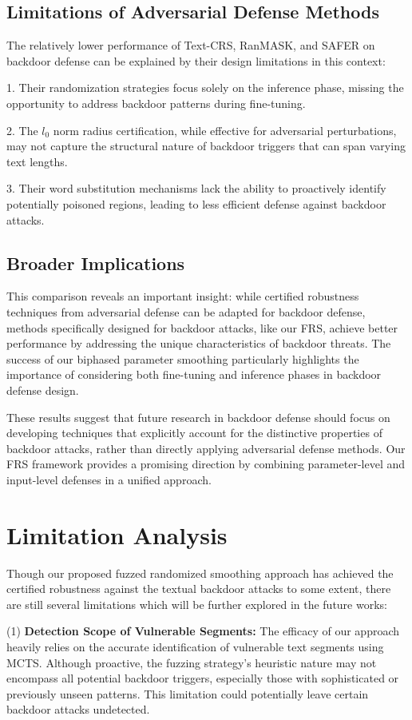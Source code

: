 \subsection{Limitations of Adversarial Defense Methods}
The relatively lower performance of Text-CRS, RanMASK, and SAFER on backdoor defense can be explained by their design limitations in this context:

1. Their randomization strategies focus solely on the inference phase, missing the opportunity to address backdoor patterns during fine-tuning.

2. The $l_0$ norm radius certification, while effective for adversarial perturbations, may not capture the structural nature of backdoor triggers that can span varying text lengths.

3. Their word substitution mechanisms lack the ability to proactively identify potentially poisoned regions, leading to less efficient defense against backdoor attacks.

\subsection{Broader Implications}
This comparison reveals an important insight: while certified robustness techniques from adversarial defense can be adapted for backdoor defense, methods specifically designed for backdoor attacks, like our FRS, achieve better performance by addressing the unique characteristics of backdoor threats. The success of our biphased parameter smoothing particularly highlights the importance of considering both fine-tuning and inference phases in backdoor defense design.

These results suggest that future research in backdoor defense should focus on developing techniques that explicitly account for the distinctive properties of backdoor attacks, rather than directly applying adversarial defense methods. Our FRS framework provides a promising direction by combining parameter-level and input-level defenses in a unified approach.

\section{Limitation Analysis}
Though our proposed fuzzed randomized smoothing approach has achieved the certified robustness against the textual backdoor attacks to some extent, there are still several limitations which will be further explored in the future works:

(1) \textbf{Detection Scope of Vulnerable Segments:} The efficacy of our approach heavily relies on the accurate identification of vulnerable text segments using MCTS. Although proactive, the fuzzing strategy's heuristic nature may not encompass all potential backdoor triggers, especially those with sophisticated or previously unseen patterns. This limitation could potentially leave certain backdoor attacks undetected.

